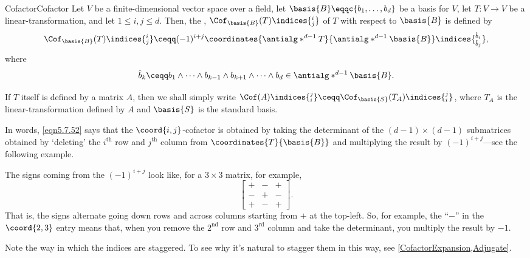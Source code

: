 \begin{dfn}{Cofactor}{Cofactor}
	Let $V$ be a finite-dimensional vector space over a field, let $\basis{B}\eqqc \{ b_1,\ldots ,b_d\}$ be a basis for $V$, let $T\colon V\rightarrow V$ be a linear-transformation, and let $1\leq i,j\leq d$.  Then, the , $\Cof _{\basis{B}}(T)\indices{_j^i}$ of $T$ with respect to $\basis{B}$ is defined by
	\begin{equation}\label{eqn5.7.52}
		\Cof _{\basis{B}}(T)\indices{_j^i}\ceqq (-1)^{i+j}\coordinates{\antialg* ^{d-1}T}{\antialg* ^{d-1}\basis{B}}\indices{^{\hat{b}_i}_{\hat{b}_j}},
	\end{equation}
	where
	\begin{equation}
		\hat{b}_k\ceqq b_1\wedge \cdots \wedge b_{k-1}\wedge b_{k+1}\wedge \cdots \wedge b_d\in \antialg* ^{d-1}\basis{B}.
	\end{equation}
	\begin{rmk}
		If $T$ itself is defined by a matrix $A$, then we shall simply write $\Cof (A)\indices{_i^j}\ceqq \Cof _{\basis{S}}(T_A)\indices{_i^j}$, where $T_A$ is the linear-transformation defined by $A$ and $\basis{S}$ is the standard basis.
	\end{rmk}
	\begin{rmk}
		In words, \eqref{eqn5.7.52} says that the $\coord{i,j}$-cofactor is obtained by taking the determinant of the $(d-1)\times (d-1)$ submatrices obtained by `deleting' the $i^{\text{th}}$ row and $j^{\text{th}}$ column from $\coordinates{T}{\basis{B}}$ and multiplying the result by $(-1)^{i+j}$---see the following example.
	\end{rmk}
	\begin{rmk}
		The signs coming from the $(-1)^{i+j}$ look like, for a $3\times 3$ matrix, for example,
		\begin{equation}
			\begin{bmatrix}+ & - & + \\ - & + & - \\ + & - & +\end{bmatrix}.
		\end{equation}
		That is, the signs alternate going down rows and across columns starting from $+$ at the top-left.  So, for example, the ``$-$'' in the $\coord{2,3}$ entry means that, when you remove the $2^{\text{nd}}$ row and $3^{\text{rd}}$ column and take the determinant, you multiply the result by $-1$.
	\end{rmk}
	\begin{rmk}
		Note the way in which the indices are staggered.  To see why it's natural to stagger them in this way, see \cref{CofactorExpansion,Adjugate}.
	\end{rmk}
\end{dfn}
